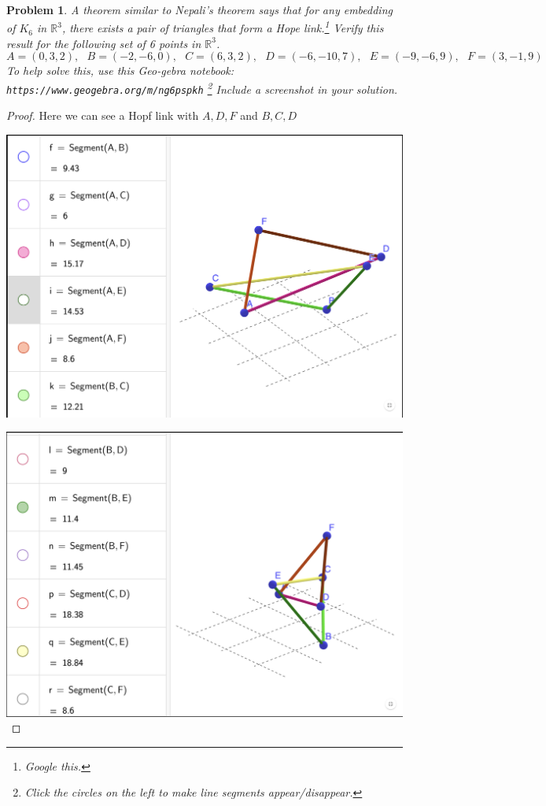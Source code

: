 \documentclass[11pt]{article}
\newtheorem{problem}{Problem}
\begin{document}
\pagebreak

\begin{problem}
A theorem similar to Nepali's theorem says that for any embedding of $K_6$ in $\mathbb R^3$, there exists a pair of triangles that form a Hope link.\footnote{Google this.} Verify this result for the following set of 6 points in $\mathbb R^3$. 
\[A=(0,3,2), \>\>\>B=(-2,-6,0), \>\>\>C=(6,3,2), \>\>\>D=(-6,-10,7), \>\>\>E=(-9,-6,9),\>\>\>F=(3,-1,9)\]
To help solve this, use this Geo-gebra notebook: 
\texttt{https://www.geogebra.org/m/ng6pspkh} \footnote{Click the circles on the left to make line segments appear/disappear.} Include a screenshot in your solution. 
\end{problem}
\begin{proof} Here we can see a Hopf link with \(A,D,F\) and \(B,C,D\) 

\includegraphics*[scale=.2]{Images/Screenshot 2023-04-14 at 1.37.03 PM.png}
	
\includegraphics*[scale=.2]{Images/Screenshot 2023-04-14 at 1.37.19 PM.png}
	

\end{proof}
\end{document}
